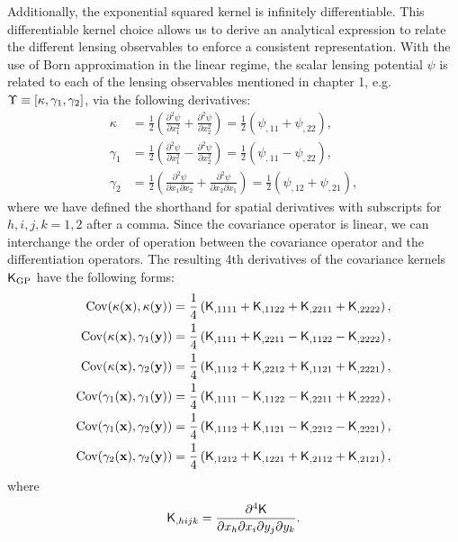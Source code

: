 Additionally, the exponential squared kernel is infinitely differentiable. This
differentiable kernel choice allows us to derive an analytical expression to
relate the different lensing observables to enforce a consistent representation.  
With the use of Born approximation in the linear regime, the scalar lensing potential $\psi$ is related to 
each of the lensing observables mentioned in chapter 1, e.g. 
$\Upsilon \equiv [\kappa, \gamma_1, \gamma_2]$, via the following derivatives:
\begin{align}
\kappa &= \frac{1}{2}\left(\frac{\partial^2 \psi}{\partial x_1^2} +
\frac{\partial^2 \psi}{\partial x_2^2 }\right) 
= \frac{1}{2} (\psi_{,11} + \psi_{,22}),\\ 
\gamma_1 
&=\frac{1}{2}\left(\frac{\partial^2 \psi}{\partial x_1^2} - 
\frac{\partial^2 \psi}{\partial x_2^2}\right) 
= \frac{1}{2} (\psi_{,11} - \psi_{,22}), \\
\gamma_2 
&=\frac{1}{2}\left(\frac{\partial^2 \psi}{\partial x_1 \partial
x_2} + \frac{\partial^2 \psi}{\partial x_2 \partial x_1}\right)
= \frac{1}{2} (\psi_{,12} + \psi_{,21}), 
\end{align}
where we have defined the shorthand for spatial derivatives with
subscripts for $h,i,j,k = 1, 2$ after a comma.
Since the covariance operator is linear, we can interchange the order of
operation between the covariance operator and the differentiation operators. 
The resulting 4th derivatives of the covariance
kernels $\mathsf{K}_{\rm GP}$ have the following forms: 
\begin{align}
	\mathrm{Cov} (\kappa(\mathbf{x}), \kappa(\mathbf{y}))
&= \frac{1}{4}\left(
\mathsf{K}_{,1111} + \mathsf{K}_{,1122} + \mathsf{K}_{,2211} + \mathsf{K}_{,2222}
\right), \label{eq:kernel_derivatives1}\\
\mathrm{Cov}(\kappa(\mathbf{x}), \gamma_1(\mathbf{y})) &= \frac{1}{4}\left(
\mathsf{K}_{,1111} + \mathsf{K}_{,2211} - \mathsf{K}_{,1122} - \mathsf{K}_{,2222}
\right), \\
\mathrm{Cov}(\kappa(\mathbf{x}), \gamma_2(\mathbf{y})) &= \frac{1}{4}\left(
\mathsf{K}_{,1112} + \mathsf{K}_{,2212} + \mathsf{K}_{,1121} + \mathsf{K}_{,2221}
\right),\\
\mathrm{Cov}(\gamma_1(\mathbf{x}), \gamma_1(\mathbf{y})) &= \frac{1}{4}\left(
\mathsf{K}_{,1111} - \mathsf{K}_{,1122} - \mathsf{K}_{,2211} + \mathsf{K}_{,2222}
\right), \\
\mathrm{Cov}(\gamma_1(\mathbf{x}), \gamma_2(\mathbf{y})) &= \frac{1}{4}\left(
\mathsf{K}_{,1112} + \mathsf{K}_{,1121} - \mathsf{K}_{,2212} - \mathsf{K}_{,2221}
\right), \\
\mathrm{Cov}(\gamma_2(\mathbf{x}), \gamma_2(\mathbf{y})) &= \frac{1}{4}\left(
\mathsf{K}_{,1212} + \mathsf{K}_{,1221} + \mathsf{K}_{,2112} + \mathsf{K}_{,2121}
\right), \label{eq:kernel_derivatives2}
\end{align}
where
\begin{equation}
	\mathsf{K}_{,hijk} = \frac{\partial^4 \mathsf{K}}{\partial x_h \partial x_i
	\partial y_j \partial y_k}.
\end{equation}

